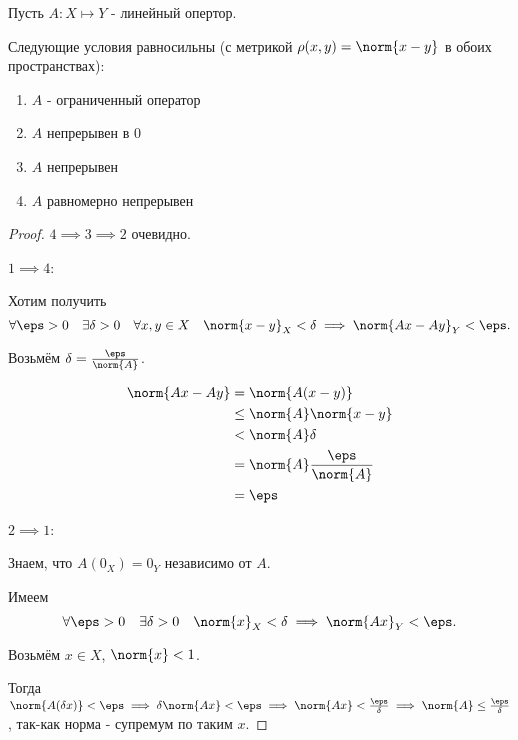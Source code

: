 
\begin{theorem} \thmslashn

    Пусть $A : X\mapsto Y$ - линейный опертор.

    Следующие условия равносильны (с метрикой $\rho(x, y) = \norm{x - y}$ в обоих пространствах):

    \begin{enumerate}
        \item $A$ - ограниченный оператор
        \item $A$ непрерывен в $0$
        \item $A$ непрерывен
        \item $A$ равномерно непрерывен
    \end{enumerate}
    \begin{proof} \thmslashn
    
        $4 \implies 3 \implies 2$ очевидно.

        $1 \implies 4$:

        Хотим получить 
        \[ \forall{\eps > 0}\quad \exists{\delta > 0}\quad \forall{x, y\in X}\quad \norm{x - y}_{X} < \delta \implies \norm{Ax - Ay}_{Y} < \eps .\] 

        Возьмём $\delta = \frac{\eps}{\norm{A}}$.

        \begin{equation*}
            \begin{split}
                \norm{Ax - Ay} 
                &= \norm{A(x-y)}\\
                &\le \norm{A} \norm{x - y}\\
                &< \norm{A} \delta\\
                &= \norm{A} \frac{\eps}{\norm{A}}\\
                &= \eps
            \end{split}
        \end{equation*}

        $2 \implies 1$:

        Знаем, что $A(0_{X}) = 0_{Y}$ независимо от $A$.

        Имеем 
        \[ \forall{\eps > 0}\quad \exists{\delta > 0}\quad \norm{x}_{X} < \delta \implies \norm{Ax}_{Y} < \eps.\]

        Возьмём $x\in X$, $\norm{x} < 1$.

        Тогда $\norm{A(\delta x)} < \eps \implies \delta \norm{Ax} < \eps \implies \norm{Ax} < \frac{\eps}{\delta} \implies \norm{A} \le \frac{\eps}{\delta}$, так-как норма - супремум по таким $x$.
    \end{proof}
\end{theorem}
